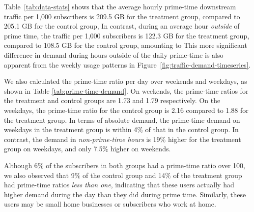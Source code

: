 Table~\ref{tab:data-stats} shows that the average hourly prime-time downstream traffic per
1,000 subscribers is
209.5 GB for the treatment group, compared to 205.1 GB for the control
group,  
In contrast, during an average hour
{\em outside} of prime time, the traffic per 1,000 subscribers is 122.3
GB for the treatment group, compared to
108.5 GB for the control group, amounting to  This
more significant difference in demand during hours outside of the
daily prime-time is also apparent from the weekly usage patterns in
Figure~\ref{fig:traffic-demand-timeseries}. 

We also calculated the prime-time ratio per day over weekends and
weekdays, as shown in Table \ref{tab:prime-time-demand}.  On weekends,
the prime-time ratios for the treatment and control groups are 1.73 and
1.79 respectively. On the weekdays, the prime-time ratio for the control
group is 2.16 compared to 1.88 for the treatment group. 
In terms of absolute demand, the prime-time demand
on weekdays in the treatment group is within 4\%
of that in the control group. In contrast, the demand in
{\em non-prime-time hours} is 19\% higher for the treatment group on weekdays,
and only 7.5\% higher on weekends. 

Although 6\% of the subscribers in both groups had a prime-time ratio over
100, we also observed that 9\% of the control group and 14\% of the
treatment group had prime-time ratios {\em less than one}, indicating that
these users actually had higher demand during the day than they did
during prime time. Similarly, these users may be small home
businesses or subscribers who work at home.


